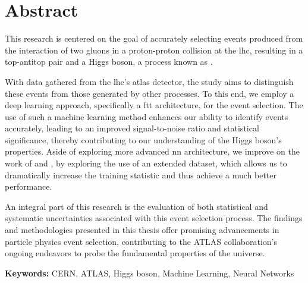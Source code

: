 \chapter*{Abstract}

This research is centered on the goal of accurately selecting events produced from the interaction of two gluons in a
proton-proton collision at the \acrshort{lhc}, resulting in a top-antitop pair and a Higgs boson, a process known as \tth.

With data gathered from the \acrshort{lhc}'s \acrshort{atlas} detector, the study aims to distinguish these \tth events
from those generated by other processes. To this end, we employ a deep learning approach, specifically a \acrshort{ftt}
architecture, for the event selection. The use of such a machine learning method enhances our ability to identify \tth
events accurately, leading to an improved signal-to-noise ratio and statistical significance, thereby contributing to
our understanding of the Higgs boson's properties. Aside of exploring more advanced \acrshort{nn} architecture, we
improve on the work of \cite{severin} and \cite{jan}, by exploring the use of an extended dataset, which allows us to
dramatically increase the training statistic and thus achieve a much better performance.

An integral part of this research is the evaluation of both statistical and systematic uncertainties associated with
this event selection process. The findings and methodologies presented in this thesis offer promising advancements in
particle physics event selection, contributing to the ATLAS collaboration's ongoing endeavors to probe the fundamental
properties of the universe.

\vspace{3mm}
\noindent
\textbf{Keywords:}
CERN, ATLAS, Higgs boson, Machine Learning, Neural Networks